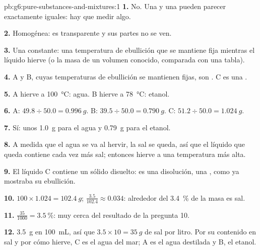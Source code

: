 \begin{solution}{pb:g6:pure-substances-and-mixtures:1}
\textbf{1.} No. Una  y una  pueden
parecer exactamente iguales: hay que medir algo.

\textbf{2.} Homogénea: es transparente y sus partes no se ven.

\textbf{3.} Una constante: una temperatura de ebullición que se mantiene
fija mientras el líquido hierve (o la masa de un volumen conocido,
comparada con una tabla).

\textbf{4.} A y B, cuyas temperaturas de ebullición se mantienen fijas,
son . C es una .

\textbf{5.} A hierve a \qty{100}{\celsius}: agua. B hierve a
\qty{78}{\celsius}: etanol.

\textbf{6.} A: $49.8 \div 50.0 = \qty{0.996}{g}$. B: $39.5 \div 50.0 =
\qty{0.790}{g}$. C: $51.2 \div 50.0 = \qty{1.024}{g}$.

\textbf{7.} Sí: unos \qty{1.0}{g} para el agua y \qty{0.79}{g} para el
etanol.

\textbf{8.} A medida que el agua se va al hervir, la sal se queda, así
que el líquido que queda contiene cada vez más sal; entonces hierve a
una temperatura más alta.

\textbf{9.} El líquido C contiene un sólido disuelto: es una disolución,
una , como ya mostraba su ebullición.

\textbf{10.} $100 \times 1.024 = \qty{102.4}{g}$; $\frac{3.5}{102.4}
\approx 0.034$: alrededor del \qty{3.4}{\percent} de la masa es sal.

\textbf{11.} $\frac{35}{1000} = \qty{3.5}{\percent}$: muy cerca del
resultado de la pregunta 10.

\textbf{12.} \qty{3.5}{g} en \qty{100}{mL}, así que $3.5 \times 10 =
\qty{35}{g}$ de sal por litro. Por su contenido en sal y por cómo
hierve, C es el agua del mar; A es el agua destilada y B, el etanol.
\end{solution}
